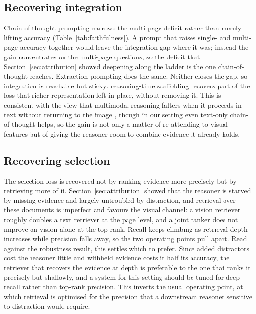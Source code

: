 \documentclass[11pt]{article}
\begin{document}
\subsection{Recovering integration}
\label{subsec:mit_integration}
Chain-of-thought prompting narrows the multi-page deficit rather than merely lifting accuracy (Table~\ref{tab:faithfulness}). A prompt that raises single- and multi-page accuracy together would leave the integration gap where it was; instead the gain concentrates on the multi-page questions, so the deficit that Section~\ref{sec:attribution} showed deepening along the ladder is the one chain-of-thought reaches. Extraction prompting does the same. Neither closes the gap, so integration is reachable but sticky: reasoning-time scaffolding recovers part of the loss that richer representation left in place, without removing it.
This is consistent with the view that multimodal reasoning falters when it proceeds in text without returning to the image \citep{hu2026tvicot}, though in our setting even text-only chain-of-thought helps, so the gain is not only a matter of re-attending to visual features but of giving the reasoner room to combine evidence it already holds.

\subsection{Recovering selection}
\label{subsec:mit_selection}
The selection loss is recovered not by ranking evidence more precisely but by retrieving more of it. Section~\ref{sec:attribution} showed that the reasoner is starved by missing evidence and largely untroubled by distraction, and retrieval over these documents is imperfect and favours the visual channel: a vision retriever roughly doubles a text retriever at the page level, and a joint ranker does not improve on vision alone at the top rank. Recall keeps climbing as retrieval depth increases while precision falls away, so the two operating points pull apart.
Read against the robustness result, this settles which to prefer. Since added distractors cost the reasoner little and withheld evidence costs it half its accuracy, the retriever that recovers the evidence at depth is preferable to the one that ranks it precisely but shallowly, and a system for this setting should be tuned for deep recall rather than top-rank precision. This inverts the usual operating point, at which retrieval is optimised for the precision that a downstream reasoner sensitive to distraction would require.
\end{document}
